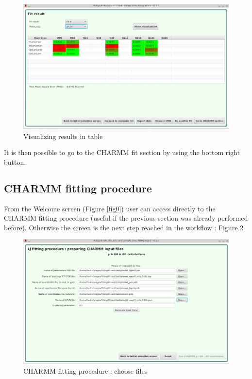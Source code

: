 \documentclass[12pt,a4paper]{article}
\begin{document}
\begin{figure}[h!]
\centering
\includegraphics[width=0.9\linewidth]{pics/scr3}
\caption{Visualizing results in table}
\label{fig3}
\end{figure}

It is then possible to go to the CHARMM fit section by using the bottom right button.

\clearpage

\subsection{CHARMM fitting procedure}

From the Welcome screen (Figure \ref{fig0}) user can access directly to the CHARMM fitting 
procedure (useful if the previous section was already performed before). Otherwise the screen is 
the next step reached in the workflow : Figure \ref{fig4} \\

\begin{figure}[h!]
\centering
\includegraphics[width=0.9\linewidth]{pics/scr4}
\caption{CHARMM fitting procedure : choose files}
\label{fig4}
\end{figure}
\end{document}
